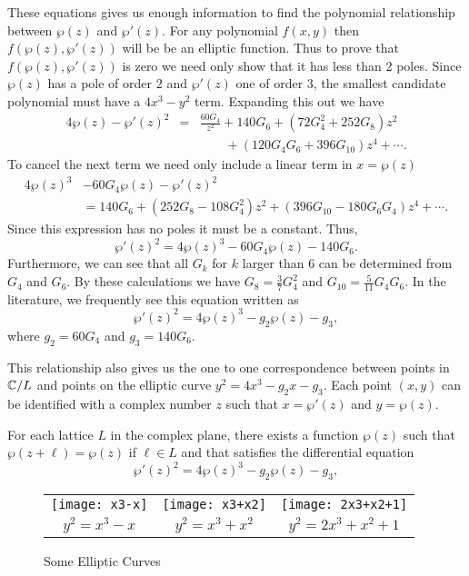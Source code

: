 These equations gives us enough information to find the polynomial
relationship between $\wp(z)$ and $\wp'(z)$.  For any polynomial
$f(x,y)$ then $f(\wp(z), \wp'(z))$ will be be an elliptic function.
Thus to prove that $f(\wp(z), \wp'(z))$ is zero we need only show that
it has less than 2 poles.  Since $\wp(z)$ has a pole of order $2$ and
$\wp'(z)$ one of order $3$, the smallest candidate polynomial must have
a $4x^3-y^2$ term.  Expanding this out we have
\begin{eqnarray*}
4\wp(z) - \wp'(z)^2 &=&
\frac{60 G_4}{z^2} + 140 G_6 + (72 G_4^2 + 252 G_8) z^2 \\
&&\qquad + (120 G_4 G_6 +396 G_{10})z^4 + \cdots.
\end{eqnarray*}
To cancel the next term we need only include a linear term in $x = \wp(z)$
\[
\begin{aligned}
4 \wp(z)^3 & - 60 G_4 \wp(z) - \wp'(z)^2 \\
 & = 140G_6 + (252 G_8 - 108 G_4^2) z^2 
     + (396 G_{10} - 180 G_6 G_4) z^4 + \cdots.
\end{aligned}
\]
Since this expression has no poles it must be a constant.  Thus, 
\[
\wp'(z)^2 = 4 \wp(z)^3 - 60 G_4 \wp(z) - 140 G_6.
\]
Furthermore, we can see that all $G_k$ for $k$ larger than 6 can be
determined from $G_4$ and $G_6$.  By these calculations we have
$G_8 = \frac{3}{7} G_4^2$ and $G_{10} = \frac{5}{11} G_4 G_6.$
In the literature, we frequently see this equation written as
\begin{equation} \label{Weier:DE:Eq}
\wp'(z)^2 = 4\wp(z)^3 -g_2 \wp(z) - g_3,
\end{equation}
where $g_2 = 60G_4$ and $g_3 = 140G_6$.

This relationship also gives us the one to one correspondence between
points in $\mathbb{C}/L$ and points on the elliptic curve 
$y^2 = 4 x^3 - g_2 x - g_3$.  Each point $(x,y)$ can be identified
with a complex number $z$ such that $x = \wp'(z)$ and $y = \wp(z)$.

\begin{proposition}
For each lattice $L$ in the complex plane, there exists a function
$\wp(z)$ such that $\wp(z + \ell) = \wp(z)$ if $\ell \in L$ and that
satisfies the differential equation
\[
\wp'(z)^2 = 4\wp(z)^3 -g_2 \wp(z) - g_3,
\]
\end{proposition}

\begin{figure}
\begin{center}
\begin {tabular}{ccc}
\texttt{[image: x3-x]} &
\texttt{[image: x3+x2]} &  
\texttt{[image: 2x3+x2+1]} \\
$y^2 = x^3 -x $ & $y^2=x^3+x^2$ & $y^2=2x^3+x^2+1$ 
\end{tabular}
\end{center}
\caption{Some Elliptic Curves}
\end{figure}

